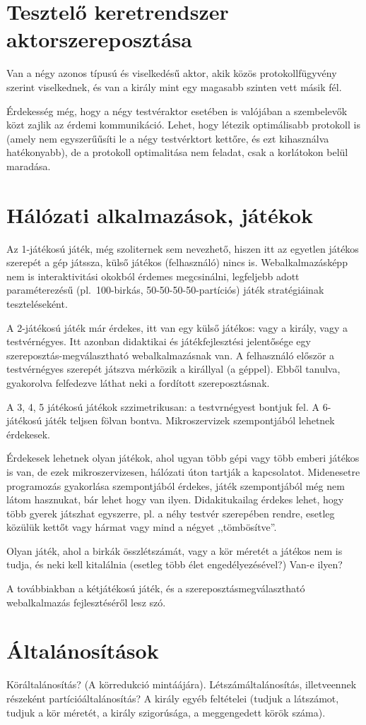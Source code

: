 \documentclass{article}
\begin{document}
	\section{Tesztelő keretrendszer aktorszereposztása}

	Van a négy azonos típusú és viselkedésű aktor, akik közös protokollfügyvény szerint viselkednek, és van a király mint egy magasabb szinten vett másik fél.

	Érdekesség még, hogy a négy testvéraktor esetében is valójában a szembelevők közt zajlik az érdemi kommunikáció. Lehet, hogy létezik optimálisabb protokoll is (amely nem egyszerűűsíti le a négy testvérktort kettőre, és ezt kihasználva hatékonyabb), de a protokoll optimalitása nem feladat, csak a korlátokon belül maradása.

	\section{Hálózati alkalmazások, játékok}

	Az 1-játékosú játék, még szoliternek sem nevezhető, hiszen itt az egyetlen játékos szerepét a gép játssza, külső játékos (felhasználó) nincs is. Webalkalmazásképp nem is interaktivitási okokból érdemes megcsinálni, legfeljebb adott paraméterezésű (pl.~100-birkás, 50-50-50-50-partíciós) játék stratégiáinak teszteléseként.

	A 2-játékosú játék már érdekes, itt van egy külső játékos: vagy a király, vagy a testvérnégyes. Itt azonban didaktikai és játékfejlesztési jelentősége egy szereposztás-megválasztható webalkalmazásnak van. A felhasználó először a testvérnégyes szerepét játszva mérközik a királlyal (a géppel). Ebből tanulva, gyakorolva felfedezve láthat neki a fordított szereposztásnak.

	A 3, 4, 5 játékosú játékok szzimetrikusan: a testvrnégyest bontjuk fel. A 6-játékosú játék teljsen fölvan bontva. Mikroszervizek szempontjából lehetnek érdekesek.

	Érdekesek lehetnek olyan játékok, ahol ugyan több gépi vagy több emberi játékos is van, de ezek mikroszervizesen, hálózati úton tartják a kapcsolatot. Midenesetre programozás gyakorlása szempontjából érdekes, játék szempontjából még nem látom hasznukat, bár lehet hogy van ilyen. Didakitukailag érdekes lehet, hogy több gyerek játszhat egyszerre, pl. a néhy testvér szerepében rendre, esetleg közülük kettőt vagy hármat vagy mind a négyet ,,tömbösítve''.

	Olyan játék, ahol a birkák összlétszámát, vagy a kör méretét a játékos nem is tudja, és neki kell kitalálnia (esetleg több élet engedélyezésével?) Van-e ilyen?

	A továbbiakban a kétjátékosú játék, és a szereposztásmegválasztható webalkalmazás fejlesztéséről lesz szó.

	\section{Általánosítások}

	Köráltalánosítás? (A körredukció mintáájára). Létszámáltalánosítás, illetveennek részeként partícióáltalánosítás? A király egyéb feltételei (tudjuk a látszámot, tudjuk a kör méretét, a király szigorúsága, a meggengedett körök száma).
\end{document}
